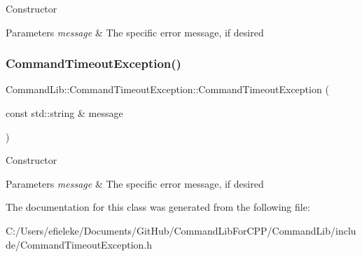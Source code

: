 Constructor


\begin{DoxyParams}{Parameters}
{\em message} & The specific error message, if desired\\
\hline
\end{DoxyParams}
\mbox{\label{class_command_lib_1_1_command_timeout_exception_a804d6433419ab58fc046fa2b982f4410}} 
\subsubsection{\texorpdfstring{Command\+Timeout\+Exception()}{CommandTimeoutException()}\hspace{0.1cm}{\footnotesize\ttfamily [3/3]}}
{\footnotesize\ttfamily Command\+Lib\+::\+Command\+Timeout\+Exception\+::\+Command\+Timeout\+Exception (\begin{DoxyParamCaption}\item[{const std\+::string \&}]{message }\end{DoxyParamCaption})\hspace{0.3cm}{\ttfamily [explicit]}}



Constructor


\begin{DoxyParams}{Parameters}
{\em message} & The specific error message, if desired\\
\hline
\end{DoxyParams}


The documentation for this class was generated from the following file\+:\begin{DoxyCompactItemize}
\item 
C\+:/\+Users/efieleke/\+Documents/\+Git\+Hub/\+Command\+Lib\+For\+C\+P\+P/\+Command\+Lib/include/Command\+Timeout\+Exception.\+h\end{DoxyCompactItemize}
